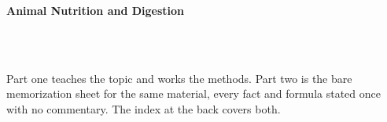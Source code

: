



\makeindex[title={Index of This Volume},columns=2,intoc]

\begin{titlepage}\thispagestyle{empty}
\vspace*{0.14\textheight}
\noindent{\color{tiercore}\rule{\textwidth}{5pt}}\\[3pt]
\noindent{\color{bioline}\rule{\textwidth}{1pt}}\\[26pt]
\\[12pt]
\noindent\begin{minipage}{\textwidth}\raggedright
{\sffamily\bfseries\fontsize{28}{32}\selectfont\color{bioink}%
 \hyphenchar{} Animal Nutrition and Digestion\par}\end{minipage}\\[16pt]
\noindent{\color{biogreen}\rule{\textwidth}{1.4pt}}\\[10pt]
\noindent\begin{minipage}{\textwidth}\raggedright
{\fontsize{10.5}{14}\selectfont\color{biogreen}%
Part one teaches the topic and works the methods. Part two is the bare memorization sheet for the
same material, every fact and formula stated once with no commentary. The index at the back covers both.\par}\end{minipage}
\vfill
\noindent{\color{bioline}\rule{\textwidth}{1pt}}\\[3pt]
\noindent{\color{tiercore}\rule{\textwidth}{5pt}}
\end{titlepage}
\tableofcontents
\clearpage
{}
\clearpage
\printindex


